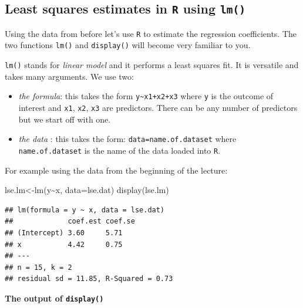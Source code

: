 \documentclass[
]{gitbook}
\newenvironment{Shaded}{\begin{snugshade}}{\end{snugshade}}
\newcommand{\AttributeTok}[1]{\textcolor[rgb]{0.77,0.63,0.00}{#1}}
\newcommand{\FunctionTok}[1]{\textcolor[rgb]{0.00,0.00,0.00}{#1}}
\newcommand{\NormalTok}[1]{#1}
\newcommand{\OtherTok}[1]{\textcolor[rgb]{0.56,0.35,0.01}{#1}}
\newcommand{\SpecialCharTok}[1]{\textcolor[rgb]{0.00,0.00,0.00}{#1}}
\providecommand{\tightlist}{%
  \setlength{\itemsep}{0pt}\setlength{\parskip}{0pt}}
\begin{document}
\hypertarget{least-squares-estimates-in-r-using-lm}{%
\subsection{\texorpdfstring{Least squares estimates in \texttt{R} using \texttt{lm()}}{Least squares estimates in R using lm()}}\label{least-squares-estimates-in-r-using-lm}}

Using the data from before let's use \texttt{R} to estimate the regression coefficients. The two functions \texttt{lm()} and \texttt{display()} will become very familiar to you.

\texttt{lm()} stands for \emph{linear model} and it performs a least squares fit. It is versatile and takes many arguments. We use two:

\begin{itemize}
\tightlist
\item
  \emph{the formula}: this takes the form \texttt{y\textasciitilde{}x1+x2+x3} where \texttt{y} is the outcome of interest and \texttt{x1}, \texttt{x2}, \texttt{x3} are predictors. There can be any number of predictors but we start off with one.
\item
  \emph{the data} : this takes the form: \texttt{data=name.of.dataset} where \texttt{name.of.dataset} is the name of the data loaded into \texttt{R}.
\end{itemize}

For example using the data from the beginning of the lecture:

\begin{Shaded}
\begin{Highlighting}[]
\NormalTok{lse.lm}\OtherTok{\textless{}{-}}\FunctionTok{lm}\NormalTok{(y}\SpecialCharTok{\textasciitilde{}}\NormalTok{x, }\AttributeTok{data=}\NormalTok{lse.dat)}
\FunctionTok{display}\NormalTok{(lse.lm)}
\end{Highlighting}
\end{Shaded}

\begin{verbatim}
## lm(formula = y ~ x, data = lse.dat)
##             coef.est coef.se
## (Intercept) 3.60     5.71   
## x           4.42     0.75   
## ---
## n = 15, k = 2
## residual sd = 11.85, R-Squared = 0.73
\end{verbatim}

\textbf{The output of \texttt{display()}}
\end{document}
